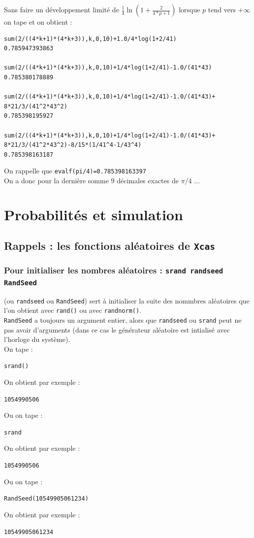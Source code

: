 \documentclass[a4paper,11pt]{book}
\begin{document}
Sans faire un d\'eveloppement limit\'e de $\frac{1}{4}\ln(1+\frac{2}{4*p+1})$ lorsque $p$ tend vers $+\infty$ on tape et on obtient :
\begin{verbatim}
sum(2/((4*k+1)*(4*k+3)),k,0,10)+1.0/4*log(1+2/41)
0.785947393863

sum(2/((4*k+1)*(4*k+3)),k,0,10)+1/4*log(1+2/41)-1.0/(41*43)
0.785380178889

sum(2/((4*k+1)*(4*k+3)),k,0,10)+1/4*log(1+2/41)-1.0/(41*43)+
8*21/3/(41^2*43^2)
0.785398195927

sum(2/((4*k+1)*(4*k+3)),k,0,10)+1/4*log(1+2/41)-1.0/(41*43)+
8*21/3/(41^2*43^2)-8/15*(1/41^4-1/43^4)
0.785398163187
\end{verbatim}
On rappelle que {\tt evalf(pi/4)=0.785398163397}\\
On a donc pour la derni\`ere somme 9 d\'ecimales exactes de $\pi/4$ ...

\chapter{Probabilit\'es et simulation}
\section{Rappels : les fonctions al\'eatoires de {\tt Xcas}}
\subsection{Pour initialiser les nombres al\'eatoires : {\tt srand randseed RandSeed}}
 (ou {\tt randseed} ou {\tt RandSeed}) sert \`a 
initialiser la suite des nommbres al\'eatoires que l'on obtient avec 
{\tt rand()} ou avec {\tt randnorm()}.\\
{\tt RandSeed} a toujours un argument entier, alors que {\tt randseed} ou 
{\tt srand} peut ne pas avoir d'arguments (dans ce cas le g\'en\'erateur 
al\'eatoire est intialis\'e avec l'horloge du syst\`eme).\\ 
On tape :
\begin{center}{\tt srand()}\end{center}
On obtient par exemple :
\begin{center}{\tt 1054990506}\end{center}
Ou on tape :
\begin{center}{\tt srand}\end{center}
On obtient par exemple :
\begin{center}{\tt 1054990506}\end{center}
Ou on tape :
\begin{center}{\tt  RandSeed(10549905061234)}\end{center}
On obtient par exemple :
\begin{center}{\tt 10549905061234}\end{center}
\end{document}
